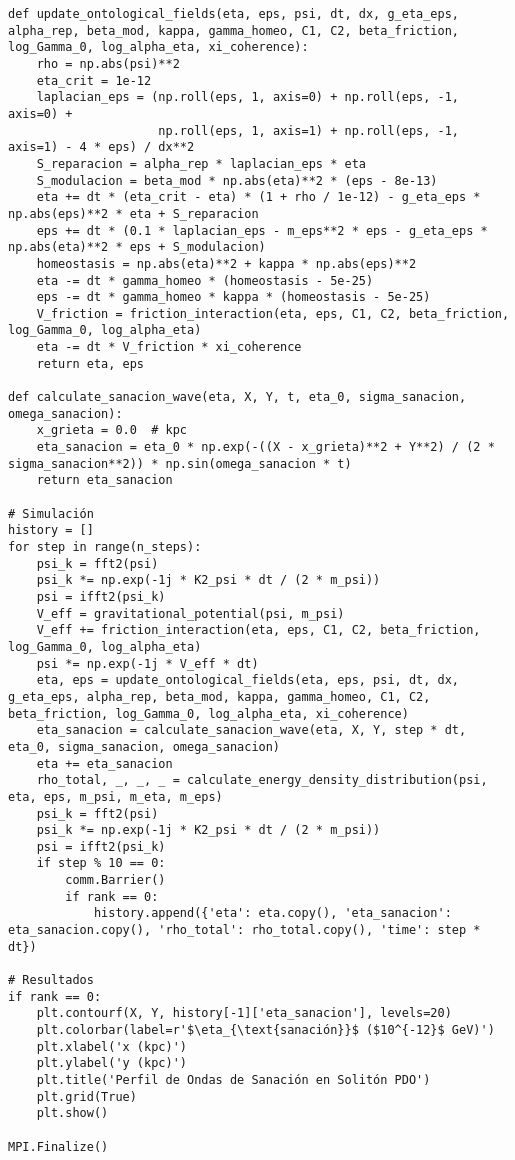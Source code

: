 \documentclass[a4paper,12pt]{article}
\begin{document}
\begin{verbatim}
def update_ontological_fields(eta, eps, psi, dt, dx, g_eta_eps, alpha_rep, beta_mod, kappa, gamma_homeo, C1, C2, beta_friction, log_Gamma_0, log_alpha_eta, xi_coherence):
    rho = np.abs(psi)**2
    eta_crit = 1e-12
    laplacian_eps = (np.roll(eps, 1, axis=0) + np.roll(eps, -1, axis=0) +
                     np.roll(eps, 1, axis=1) + np.roll(eps, -1, axis=1) - 4 * eps) / dx**2
    S_reparacion = alpha_rep * laplacian_eps * eta
    S_modulacion = beta_mod * np.abs(eta)**2 * (eps - 8e-13)
    eta += dt * (eta_crit - eta) * (1 + rho / 1e-12) - g_eta_eps * np.abs(eps)**2 * eta + S_reparacion
    eps += dt * (0.1 * laplacian_eps - m_eps**2 * eps - g_eta_eps * np.abs(eta)**2 * eps + S_modulacion)
    homeostasis = np.abs(eta)**2 + kappa * np.abs(eps)**2
    eta -= dt * gamma_homeo * (homeostasis - 5e-25)
    eps -= dt * gamma_homeo * kappa * (homeostasis - 5e-25)
    V_friction = friction_interaction(eta, eps, C1, C2, beta_friction, log_Gamma_0, log_alpha_eta)
    eta -= dt * V_friction * xi_coherence
    return eta, eps

def calculate_sanacion_wave(eta, X, Y, t, eta_0, sigma_sanacion, omega_sanacion):
    x_grieta = 0.0  # kpc
    eta_sanacion = eta_0 * np.exp(-((X - x_grieta)**2 + Y**2) / (2 * sigma_sanacion**2)) * np.sin(omega_sanacion * t)
    return eta_sanacion

# Simulación
history = []
for step in range(n_steps):
    psi_k = fft2(psi)
    psi_k *= np.exp(-1j * K2_psi * dt / (2 * m_psi))
    psi = ifft2(psi_k)
    V_eff = gravitational_potential(psi, m_psi)
    V_eff += friction_interaction(eta, eps, C1, C2, beta_friction, log_Gamma_0, log_alpha_eta)
    psi *= np.exp(-1j * V_eff * dt)
    eta, eps = update_ontological_fields(eta, eps, psi, dt, dx, g_eta_eps, alpha_rep, beta_mod, kappa, gamma_homeo, C1, C2, beta_friction, log_Gamma_0, log_alpha_eta, xi_coherence)
    eta_sanacion = calculate_sanacion_wave(eta, X, Y, step * dt, eta_0, sigma_sanacion, omega_sanacion)
    eta += eta_sanacion
    rho_total, _, _, _ = calculate_energy_density_distribution(psi, eta, eps, m_psi, m_eta, m_eps)
    psi_k = fft2(psi)
    psi_k *= np.exp(-1j * K2_psi * dt / (2 * m_psi))
    psi = ifft2(psi_k)
    if step % 10 == 0:
        comm.Barrier()
        if rank == 0:
            history.append({'eta': eta.copy(), 'eta_sanacion': eta_sanacion.copy(), 'rho_total': rho_total.copy(), 'time': step * dt})

# Resultados
if rank == 0:
    plt.contourf(X, Y, history[-1]['eta_sanacion'], levels=20)
    plt.colorbar(label=r'$\eta_{\text{sanación}}$ ($10^{-12}$ GeV)')
    plt.xlabel('x (kpc)')
    plt.ylabel('y (kpc)')
    plt.title('Perfil de Ondas de Sanación en Solitón PDO')
    plt.grid(True)
    plt.show()

MPI.Finalize()
\end{verbatim}
\end{document}
